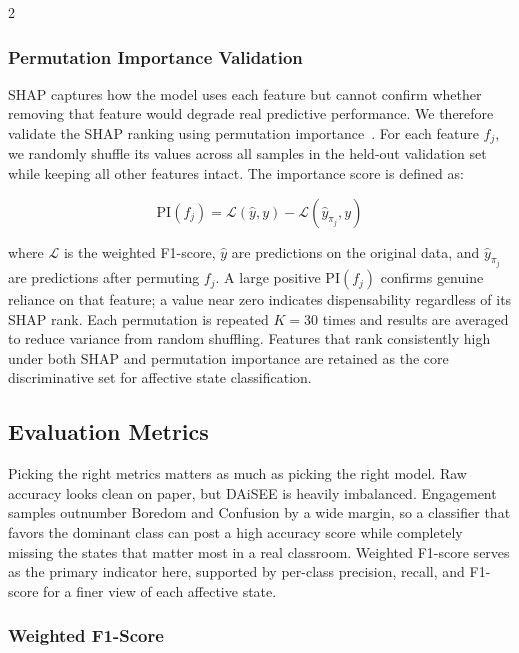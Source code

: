 \begin{multicols}{2}
  \subsubsection{Permutation Importance Validation}

  SHAP captures how the model uses each feature but cannot confirm whether removing that feature would degrade real predictive performance. We therefore validate the SHAP ranking using permutation importance~\cite{Breiman2001RandomF, Fisher2018AllMA}. For each feature $f_j$, we randomly shuffle its values across all samples in the held-out validation set while keeping all other features intact. The importance score is defined as:

  \begin{equation}
    \text{PI}(f_j) = \mathcal{L}(\hat{y}, y) - \mathcal{L}(\hat{y}_{\pi_j}, y)
  \end{equation}

  \noindent where $\mathcal{L}$ is the weighted F1-score, $\hat{y}$ are predictions on the original data, and $\hat{y}_{\pi_j}$ are predictions after permuting $f_j$. A large positive $\text{PI}(f_j)$ confirms genuine reliance on that feature; a value near zero indicates dispensability regardless of its SHAP rank. Each permutation is repeated $K{=}30$ times and results are averaged to reduce variance from random shuffling. Features that rank consistently high under both SHAP and permutation importance are retained as the core discriminative set for affective state classification.

  \subsection{Evaluation Metrics}

  Picking the right metrics matters as much as picking the right model. Raw accuracy looks clean on paper, but DAiSEE is heavily imbalanced. Engagement samples outnumber Boredom and Confusion by a wide margin, so a classifier that favors the dominant class can post a high accuracy score while completely missing the states that matter most in a real classroom. Weighted F1-score serves as the primary indicator here, supported by per-class precision, recall, and F1-score for a finer view of each affective state.

  \subsubsection{Weighted F1-Score}


\end{multicols}
